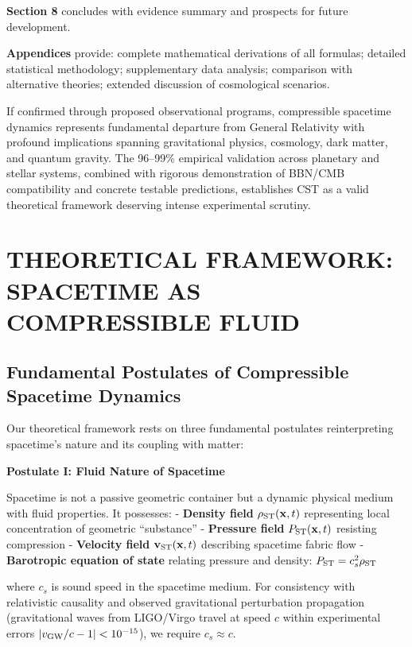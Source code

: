 \documentclass[11pt,a4paper]{article}
\begin{document}
\textbf{Section 8} concludes with evidence summary and prospects for
future development.

\textbf{Appendices} provide: complete mathematical derivations of all
formulas; detailed statistical methodology; supplementary data analysis;
comparison with alternative theories; extended discussion of
cosmological scenarios.

If confirmed through proposed observational programs, compressible
spacetime dynamics represents fundamental departure from General
Relativity with profound implications spanning gravitational physics,
cosmology, dark matter, and quantum gravity. The 96--99\% empirical
validation across planetary and stellar systems, combined with rigorous
demonstration of BBN/CMB compatibility and concrete testable
predictions, establishes CST as a valid theoretical framework deserving
intense experimental scrutiny.

\hypertarget{theoretical-framework-spacetime-as-compressible-fluid}{%
\section{THEORETICAL FRAMEWORK: SPACETIME AS COMPRESSIBLE
FLUID}\label{theoretical-framework-spacetime-as-compressible-fluid}}

\hypertarget{fundamental-postulates-of-compressible-spacetime-dynamics}{%
\subsection{Fundamental Postulates of Compressible Spacetime
Dynamics}\label{fundamental-postulates-of-compressible-spacetime-dynamics}}

Our theoretical framework rests on three fundamental postulates
reinterpreting spacetime's nature and its coupling with matter:

\textbf{Postulate I: Fluid Nature of Spacetime}

Spacetime is not a passive geometric container but a dynamic physical
medium with fluid properties. It possesses: - \textbf{Density field}
\(\rho_{\rm ST}({\bf x},t)\) representing local concentration of
geometric ``substance'' - \textbf{Pressure field}
\(P_{\rm ST}({\bf x},t)\) resisting compression - \textbf{Velocity
field} \({\bf v}_{\rm ST}({\bf x},t)\) describing spacetime fabric flow
- \textbf{Barotropic equation of state} relating pressure and density:
\(P_{\rm ST} = c_s^2 \rho_{\rm ST}\)

where \(c_s\) is sound speed in the spacetime medium. For consistency
with relativistic causality and observed gravitational perturbation
propagation (gravitational waves from LIGO/Virgo travel at speed \(c\)
within experimental errors \(|v_{\rm GW}/c - 1| < 10^{-15}\)), we
require \(c_s \approx c\).
\end{document}
